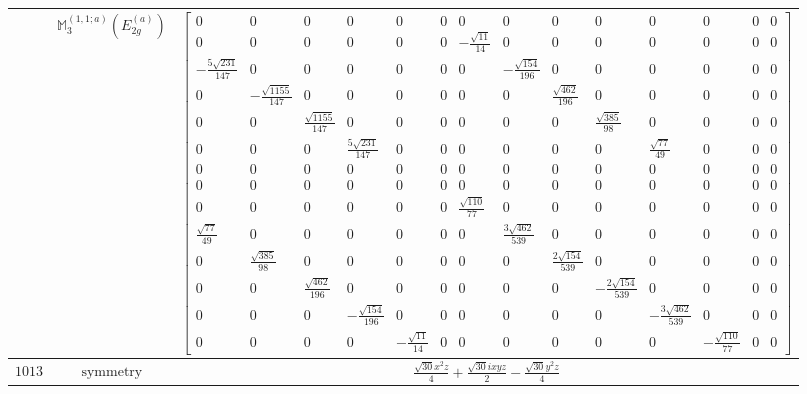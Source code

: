 \documentclass[fleqn,8pt,landscape]{jsarticle}
\begin{document}
\begin{longtable}{ccc}
$  $ & $ \mathbb{M}_{3}^{(1,1;a)}(E_{2g}^{(a)}) $ & $ \begin{bmatrix} 0 & 0 & 0 & 0 & 0 & 0 & 0 & 0 & 0 & 0 & 0 & 0 & 0 & 0 \\ 0 & 0 & 0 & 0 & 0 & 0 & - \frac{\sqrt{11}}{14} & 0 & 0 & 0 & 0 & 0 & 0 & 0 \\ - \frac{5 \sqrt{231}}{147} & 0 & 0 & 0 & 0 & 0 & 0 & - \frac{\sqrt{154}}{196} & 0 & 0 & 0 & 0 & 0 & 0 \\ 0 & - \frac{\sqrt{1155}}{147} & 0 & 0 & 0 & 0 & 0 & 0 & \frac{\sqrt{462}}{196} & 0 & 0 & 0 & 0 & 0 \\ 0 & 0 & \frac{\sqrt{1155}}{147} & 0 & 0 & 0 & 0 & 0 & 0 & \frac{\sqrt{385}}{98} & 0 & 0 & 0 & 0 \\ 0 & 0 & 0 & \frac{5 \sqrt{231}}{147} & 0 & 0 & 0 & 0 & 0 & 0 & \frac{\sqrt{77}}{49} & 0 & 0 & 0 \\ 0 & 0 & 0 & 0 & 0 & 0 & 0 & 0 & 0 & 0 & 0 & 0 & 0 & 0 \\ 0 & 0 & 0 & 0 & 0 & 0 & 0 & 0 & 0 & 0 & 0 & 0 & 0 & 0 \\ 0 & 0 & 0 & 0 & 0 & 0 & \frac{\sqrt{110}}{77} & 0 & 0 & 0 & 0 & 0 & 0 & 0 \\ \frac{\sqrt{77}}{49} & 0 & 0 & 0 & 0 & 0 & 0 & \frac{3 \sqrt{462}}{539} & 0 & 0 & 0 & 0 & 0 & 0 \\ 0 & \frac{\sqrt{385}}{98} & 0 & 0 & 0 & 0 & 0 & 0 & \frac{2 \sqrt{154}}{539} & 0 & 0 & 0 & 0 & 0 \\ 0 & 0 & \frac{\sqrt{462}}{196} & 0 & 0 & 0 & 0 & 0 & 0 & - \frac{2 \sqrt{154}}{539} & 0 & 0 & 0 & 0 \\ 0 & 0 & 0 & - \frac{\sqrt{154}}{196} & 0 & 0 & 0 & 0 & 0 & 0 & - \frac{3 \sqrt{462}}{539} & 0 & 0 & 0 \\ 0 & 0 & 0 & 0 & - \frac{\sqrt{11}}{14} & 0 & 0 & 0 & 0 & 0 & 0 & - \frac{\sqrt{110}}{77} & 0 & 0 \end{bmatrix} $ \\ \hline
$ 1013 $ & $ \text{symmetry} $ & $ \frac{\sqrt{30} x^{2} z}{4} + \frac{\sqrt{30} i x y z}{2} - \frac{\sqrt{30} y^{2} z}{4} $ \\

\end{longtable}
\end{document}
